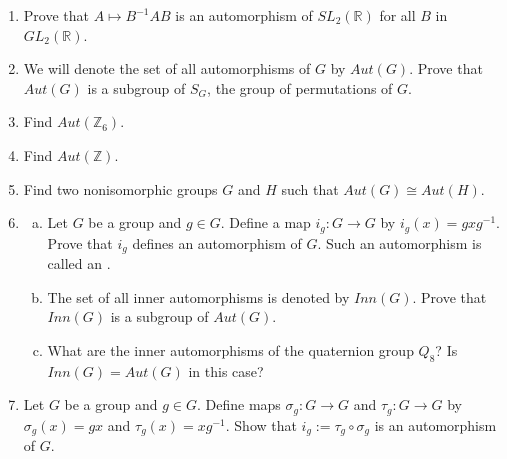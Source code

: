 {\begin{enumerate}[(1)]
\item
Prove that $A \mapsto B^{-1}AB$ is an automorphism of $SL_2({\mathbb R})$
for all $B$ in $GL_2({\mathbb R})$. 
 
\item
We will denote the set of all automorphisms of $G$ by
$Aut(G)$.  Prove that  $Aut(G)$ is a subgroup of
$S_G$, the group of permutations of $G$. 
 
\item
Find $Aut( {\mathbb Z}_6)$.

\item
Find $Aut( {\mathbb Z})$.
 
\item
Find two nonisomorphic groups $G$ and $H$ such that $Aut(G) \cong Aut(
H)$. 
 
\item
\begin{enumerate}[(a)]
\item
Let $G$ be a group and $g \in G$. Define a map $i_g : G \rightarrow
G$ 
by $i_g(x) = g x g^{-1}$.  Prove that $i_g$ defines an automorphism of
$G$.  Such an automorphism is called an .  
\item
The set of all inner
automorphisms is denoted by $Inn(G)$. Prove that $Inn(G)$ is a subgroup of $Aut(G)$.
\item
What are the inner automorphisms of the quaternion group $Q_8$? Is
$Inn(G) = Aut(G)$ in this case? 
\end{enumerate} 

\item
Let $G$ be a group and $g \in G$.  Define maps $\sigma_g :G
\rightarrow G$ and $\tau_g :G \rightarrow G$
 by $\sigma_g(x) = gx$
and $\tau_g(x) = xg^{-1}$. Show that $i_g := \tau_g \circ \sigma_g$ is
an automorphism of $G$. 
 
 
\end{enumerate}
}





